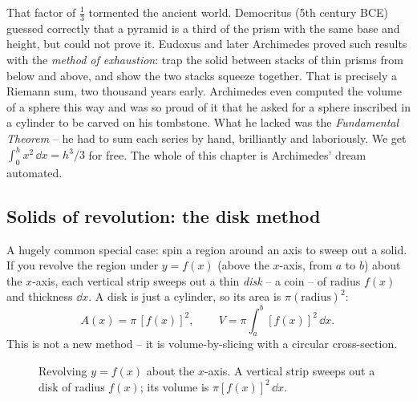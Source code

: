 \begin{historybox}
That factor of $\tfrac13$ tormented the ancient world. Democritus (5th century
BCE) guessed correctly that a pyramid is a third of the prism with the same base
and height, but could not prove it. Eudoxus and later Archimedes proved such
results with the \emph{method of exhaustion}: trap the solid between stacks of
thin prisms from below and above, and show the two stacks squeeze together. That
is precisely a Riemann sum, two thousand years early. Archimedes even computed the
volume of a sphere this way and was so proud of it that he asked for a sphere
inscribed in a cylinder to be carved on his tombstone. What he lacked was the
\emph{Fundamental Theorem} -- he had to sum each series by hand, brilliantly and
laboriously. We get $\int_0^h x^2\,\dd x = h^3/3$ for free. The whole of this
chapter is Archimedes' dream automated.
\end{historybox}

\subsection{Solids of revolution: the disk method}

A hugely common special case: spin a region around an axis to sweep out a solid.
If you revolve the region under $y=f(x)$ (above the $x$-axis, from $a$ to $b$)
about the $x$-axis, each vertical strip sweeps out a thin \emph{disk} -- a coin --
of radius $f(x)$ and thickness $\dd x$. A disk is just a cylinder, so its area is
$\pi(\text{radius})^2$:
\[
  A(x) = \pi\,[f(x)]^2, \qquad
  \boxed{\,V = \pi\int_a^b [f(x)]^2\,\dd x.\,}
\]
This is not a new method -- it is volume-by-slicing with a circular cross-section.

\begin{figure}[H]
\centering
{}
\caption{Revolving $y=f(x)$ about the $x$-axis. A vertical strip sweeps out a disk
of radius $f(x)$; its volume is $\pi[f(x)]^2\,\dd x$.}
\label{ch26:fig-disk}
\end{figure}

